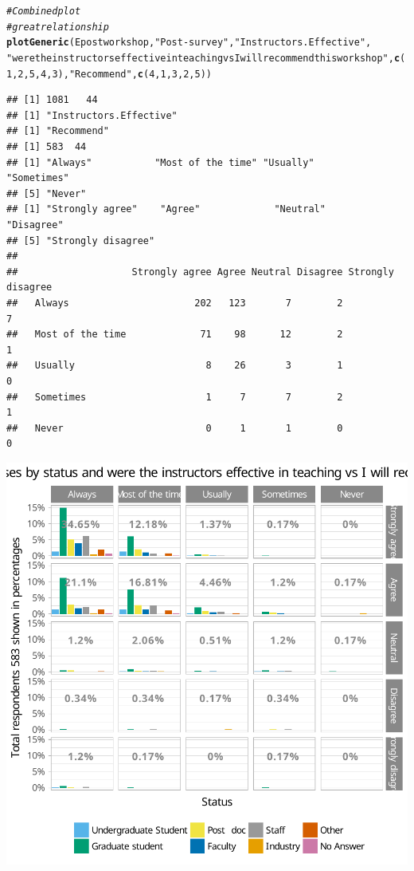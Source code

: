 \documentclass{article}\usepackage[]{graphicx}\usepackage[]{color}
\makeatletter
\newcommand{\hlnum}[1]{\textcolor[rgb]{0.686,0.059,0.569}{#1}}%
\newcommand{\hlstr}[1]{\textcolor[rgb]{0.192,0.494,0.8}{#1}}%
\newcommand{\hlcom}[1]{\textcolor[rgb]{0.678,0.584,0.686}{\textit{#1}}}%
\newcommand{\hlstd}[1]{\textcolor[rgb]{0.345,0.345,0.345}{#1}}%
\newcommand{\hlkwd}[1]{\textcolor[rgb]{0.737,0.353,0.396}{\textbf{#1}}}%
\newenvironment{kframe}{%
 \def\at@end@of@kframe{}%
 \ifinner\ifhmode%
  \def\at@end@of@kframe{\end{minipage}}%
  \begin{minipage}{\columnwidth}%
 \fi\fi%
 \def\FrameCommand##1{\hskip\@totalleftmargin \hskip-\fboxsep
 \colorbox{shadecolor}{##1}\hskip-\fboxsep
     \hskip-\linewidth \hskip-\@totalleftmargin \hskip\columnwidth}%
 \MakeFramed {\advance\hsize-\width
   \@totalleftmargin\z@ \linewidth\hsize
   \@setminipage}}%
 {\par\unskip\endMakeFramed%
 \at@end@of@kframe}
\newenvironment{knitrout}{}{} %
\makeatother
\begin{document}
\begin{knitrout}
{}


\begin{kframe}\begin{alltt}
\hlcom{# Combined plot}
\hlcom{# great relationship}
\hlkwd{plotGeneric}\hlstd{(Epostworkshop,} \hlstr{"Post-survey"}\hlstd{,} \hlstr{"Instructors.Effective"} \hlstd{,}
            \hlstr{"were the instructors effective in teaching vs I will recommend this workshop"}\hlstd{,}  \hlkwd{c}\hlstd{(}\hlnum{1}\hlstd{,}\hlnum{2}\hlstd{,}\hlnum{5}\hlstd{,}\hlnum{4}\hlstd{,}\hlnum{3}\hlstd{),}\hlstr{"Recommend"}\hlstd{,} \hlkwd{c}\hlstd{(}\hlnum{4}\hlstd{,}\hlnum{1}\hlstd{,}\hlnum{3}\hlstd{,}\hlnum{2}\hlstd{,}\hlnum{5}\hlstd{))}
\end{alltt}
\begin{verbatim}
## [1] 1081   44
## [1] "Instructors.Effective"
## [1] "Recommend"
## [1] 583  44
## [1] "Always"           "Most of the time" "Usually"          "Sometimes"       
## [5] "Never"           
## [1] "Strongly agree"    "Agree"             "Neutral"           "Disagree"         
## [5] "Strongly disagree"
##                   
##                    Strongly agree Agree Neutral Disagree Strongly disagree
##   Always                      202   123       7        2                 7
##   Most of the time             71    98      12        2                 1
##   Usually                       8    26       3        1                 0
##   Sometimes                     1     7       7        2                 1
##   Never                         0     1       1        0                 0
\end{verbatim}
\end{kframe}

{\centering \includegraphics[width=.6\linewidth]{figure/calls-Rnwplotting-postsurvey-data-28} 

}
\end{knitrout}
\end{document}
